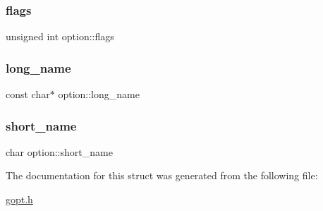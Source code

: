 \mbox{\label{structoption_a3bb757702735846b5461681fe1af2529}} 
\subsubsection{\texorpdfstring{flags}{flags}}
{\footnotesize\ttfamily unsigned int option\+::flags}

\mbox{\label{structoption_afa3bd21f993495477da6350fbdd159da}} 
\subsubsection{\texorpdfstring{long\+\_\+name}{long\_name}}
{\footnotesize\ttfamily const char$\ast$ option\+::long\+\_\+name}

\mbox{\label{structoption_abc0af4c8306684c8c31bb88193a3b040}} 
\subsubsection{\texorpdfstring{short\+\_\+name}{short\_name}}
{\footnotesize\ttfamily char option\+::short\+\_\+name}



The documentation for this struct was generated from the following file\+:\begin{DoxyCompactItemize}
\item 
\hyperlink{gopt_8h}{gopt.\+h}\end{DoxyCompactItemize}
